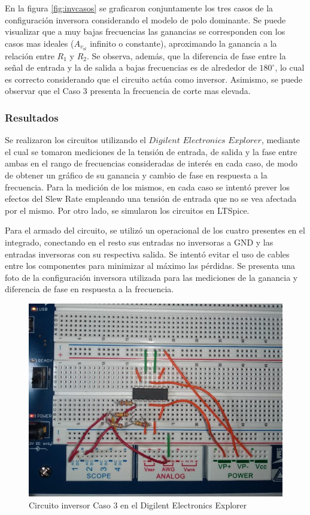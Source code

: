 En la figura \ref{fig:invcasos} se graficaron conjuntamente los tres casos de la configuración inversora considerando el modelo de polo dominante. Se puede visualizar que 
a muy bajas frecuencias las ganancias se corresponden con los casos mas ideales ($A_{v_{ol}}$ infinito o constante), aproximando la ganancia a la relación entre $R_{1}$ y $R_{2}$. Se observa, además, que la diferencia de fase entre la señal de entrada y la de salida a bajas frecuencias es de alrededor de $180^{\circ}$, lo cual es correcto considerando que el circuito actúa como inversor. 
Asimismo, se puede observar que el Caso 3 presenta la frecuencia de corte mas elevada. 

\subsubsection{Resultados}

Se realizaron los circuitos utilizando el $Digilent$ $Electronics$ $Explorer$, mediante el cual se tomaron mediciones de la tensión de entrada, de salida y la fase entre ambas en el rango de frecuencias
consideradas de interés en cada caso, de modo de obtener un gráfico de su ganancia y cambio de fase en respuesta a la frecuencia. Para la medición de los mismos, en cada caso se intentó prever los efectos del 
Slew Rate empleando una tensión de entrada que no se vea afectada por el mismo. Por otro lado, se simularon los circuitos en LTSpice. 

Para el armado del circuito, se utilizó un operacional de los cuatro presentes en el integrado, conectando en el resto sus entradas no inversoras a GND y las entradas inversoras con su respectiva salida.
Se intentó evitar el uso de cables entre los componentes para minimizar al máximo las pérdidas. Se presenta una foto de la configuración inversora utilizada para las mediciones de la ganancia y diferencia de fase 
en respuesta a la frecuencia.

\begin{figure}[H]
	\centering
	\includegraphics[scale=0.5]{./Imagenes/Inv3Freq.jpeg}
	\caption{Circuito inversor Caso 3 en el Digilent Electronics Explorer}
	\label{fig:circinvcaso1}
\end{figure}

